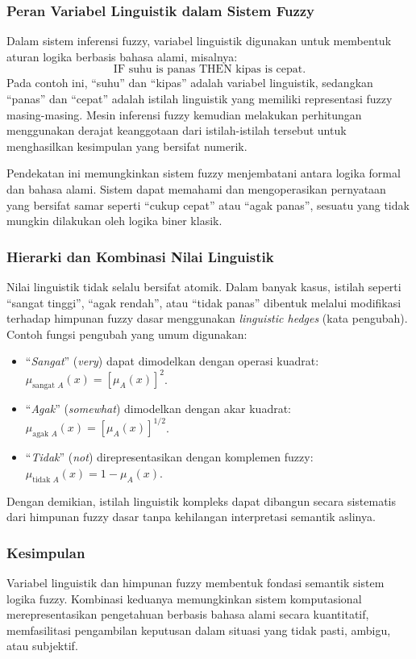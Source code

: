\documentclass[12pt,a4paper]{article}
\theoremstyle{remark}
\begin{document}
\subsubsection{Peran Variabel Linguistik dalam Sistem Fuzzy}
Dalam sistem inferensi fuzzy, variabel linguistik digunakan untuk membentuk aturan logika berbasis bahasa alami, misalnya:
\[
    \text{IF suhu is panas THEN kipas is cepat}.
\]
Pada contoh ini, “suhu” dan “kipas” adalah variabel linguistik, sedangkan “panas” dan “cepat” adalah istilah linguistik yang memiliki representasi fuzzy masing-masing. Mesin inferensi fuzzy kemudian melakukan perhitungan menggunakan derajat keanggotaan dari istilah-istilah tersebut untuk menghasilkan kesimpulan yang bersifat numerik.

Pendekatan ini memungkinkan sistem fuzzy menjembatani antara logika formal dan bahasa alami. Sistem dapat memahami dan mengoperasikan pernyataan yang bersifat samar seperti “cukup cepat” atau “agak panas”, sesuatu yang tidak mungkin dilakukan oleh logika biner klasik.

\subsubsection{Hierarki dan Kombinasi Nilai Linguistik}
Nilai linguistik tidak selalu bersifat atomik. Dalam banyak kasus, istilah seperti “sangat tinggi”, “agak rendah”, atau “tidak panas” dibentuk melalui modifikasi terhadap himpunan fuzzy dasar menggunakan \textit{linguistic hedges} (kata pengubah).
Contoh fungsi pengubah yang umum digunakan:
\begin{itemize}
    \item “\textit{Sangat}” (\textit{very}) dapat dimodelkan dengan operasi kuadrat: \(\mu_{\text{sangat }A}(x) = [\mu_A(x)]^2\).
    \item “\textit{Agak}” (\textit{somewhat}) dimodelkan dengan akar kuadrat: \(\mu_{\text{agak }A}(x) = [\mu_A(x)]^{1/2}\).
    \item “\textit{Tidak}” (\textit{not}) direpresentasikan dengan komplemen fuzzy: \(\mu_{\text{tidak }A}(x) = 1 - \mu_A(x)\).
\end{itemize}

Dengan demikian, istilah linguistik kompleks dapat dibangun secara sistematis dari himpunan fuzzy dasar tanpa kehilangan interpretasi semantik aslinya.

\subsubsection{Kesimpulan}
Variabel linguistik dan himpunan fuzzy membentuk fondasi semantik sistem logika fuzzy. Kombinasi keduanya memungkinkan sistem komputasional merepresentasikan pengetahuan berbasis bahasa alami secara kuantitatif, memfasilitasi pengambilan keputusan dalam situasi yang tidak pasti, ambigu, atau subjektif.
\end{document}
